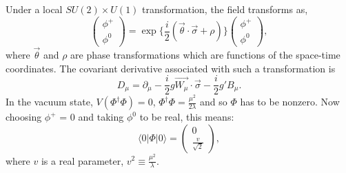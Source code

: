 Under a local $SU(2)\times U(1)$ transformation, the field transforms as,
\begin{equation}\label{eqn:hfield_trsf}
\begin{pmatrix} \phi^+ \\
\phi^0 \end{pmatrix} = \exp{\{\frac{i}{2}(\vec{\theta}\cdot\vec{\sigma} + \rho)\}}
\begin{pmatrix} \phi^+ \\
\phi^0 \end{pmatrix}, 
\end{equation}
where $\vec{\theta}$ and $\rho$
are phase transformations which are functions of the space-time coordinates. The covariant
derivative associated with such a transformation is
\begin{equation}\label{eqn:H_cov_deriv}
D_{\mu} = \partial_{\mu} - \frac{i}{2}g\vec{W_{\mu}}\cdot\vec{\sigma} - \frac{i}{2}g'B_{\mu}.
\end{equation}
In the vacuum state, $V(\Phi^{\dagger}\Phi) =0$, $\Phi^{\dagger}\Phi=\frac{\mu^2}{2\lambda}$ and so
$\Phi$ has to be nonzero.
Now choosing $\phi^+$ = 0 and taking $\phi^0$ to be real, this means:
\begin{equation}\label{eqn:field_vev}
\langle 0 | \Phi | 0 \rangle = \begin{pmatrix} 0 \\
\frac{v}{\sqrt{2}} \end{pmatrix},
\end{equation}
where $v$ is a real parameter, $v^2 \equiv \frac{\mu^2}{\lambda}$.

